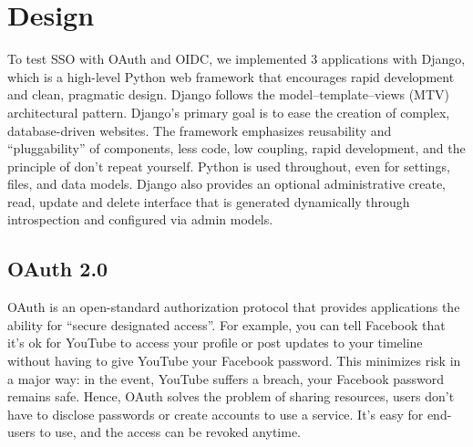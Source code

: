 \section{Design}

To test SSO with OAuth and OIDC, we implemented 3 applications with Django, which is a high-level Python web framework that encourages rapid development and clean, pragmatic design. Django follows the model–template–views (MTV) architectural pattern. Django's primary goal is to ease the creation of complex, database-driven websites. The framework emphasizes reusability and ``pluggability'' of components, less code, low coupling, rapid development, and the principle of don't repeat yourself. Python is used throughout, even for settings, files, and data models. Django also provides an optional administrative create, read, update and delete interface that is generated dynamically through introspection and configured via admin models.



\subsection{OAuth 2.0}

OAuth is an open-standard authorization protocol that provides applications the ability for ``secure designated access''. For example, you can tell Facebook that it’s ok for YouTube to access your profile or post updates to your timeline without having to give YouTube your Facebook password. This minimizes risk in a major way: in the event, YouTube suffers a breach, your Facebook password remains safe. Hence, OAuth solves the problem of sharing resources, users don't have to disclose passwords or create accounts to use a service. It's easy for end-users to use, and the access can be revoked anytime.

